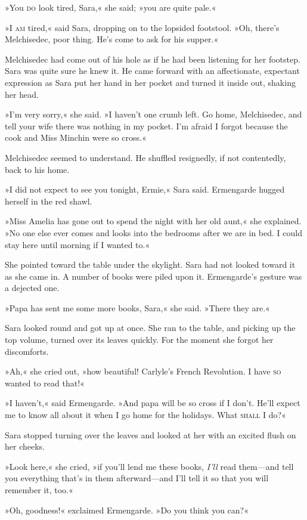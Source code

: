 »You \textsc{do} look tired, Sara,« she said; »you are quite pale.«

»I \textsc{am} tired,« said Sara, dropping on to the lopsided footstool. »Oh, there's Melchisedec, poor thing. He's come to ask for his supper.«

Melchisedec had come out of his hole as if he had been listening for her footstep. Sara was quite sure he knew it. He came forward with an affectionate, expectant expression as Sara put her hand in her pocket and turned it inside out, shaking her head.

»I'm very sorry,« she said. »I haven't one crumb left. Go home, Melchisedec, and tell your wife there was nothing in my pocket. I'm afraid I forgot because the cook and Miss Minchin were so cross.«

Melchisedec seemed to understand. He shuffled resignedly, if not contentedly, back to his home.

»I did not expect to see you tonight, Ermie,« Sara said. Ermengarde hugged herself in the red shawl.

»Miss Amelia has gone out to spend the night with her old aunt,« she explained. »No one else ever comes and looks into the bedrooms after we are in bed. I could stay here until morning if I wanted to.«

She pointed toward the table under the skylight. Sara had not looked toward it as she came in. A number of books were piled upon it. Ermengarde's gesture was a dejected one.

»Papa has sent me some more books, Sara,« she said. »There they are.«

Sara looked round and got up at once. She ran to the table, and picking up the top volume, turned over its leaves quickly. For the moment she forgot her discomforts.

»Ah,« she cried out, »how beautiful! Carlyle's French Revolution. I have \textsc{so} wanted to read that!«

»I haven't,« said Ermengarde. »And papa will be so cross if I don't. He'll expect me to know all about it when I go home for the holidays. What \textsc{shall} I do?«

Sara stopped turning over the leaves and looked at her with an excited flush on her cheeks.

»Look here,« she cried, »if you'll lend me these books, \textit{I'll} read them—and tell you everything that's in them afterward—and I'll tell it so that you will remember it, too.«

»Oh, goodness!« exclaimed Ermengarde. »Do you think you can?«

